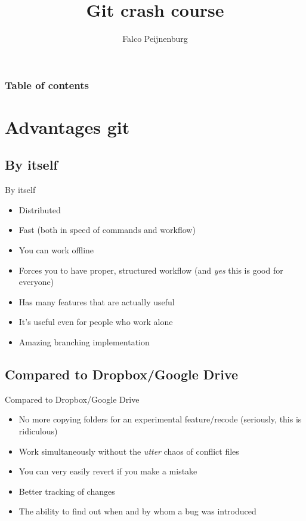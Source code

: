 \documentclass[10pt,a4paper]{beamer}
\author{Falco Peijnenburg}
\title[Git crash course\hspace{40mm} \insertframenumber/\inserttotalframenumber]{Git crash course}
\begin{document}
\frame{\titlepage}

\setcounter{tocdepth}{1}
\begin{frame}
\frametitle{Table of contents}
\tableofcontents[]
\end{frame}



\section{Advantages git}

\subsection{By itself}
\begin{frame}{By itself}
\begin{itemize}
\item Distributed
\item Fast (both in speed of commands and workflow)
\item You can work offline
\item Forces you to have proper, structured workflow (and \textit{yes} this is good for everyone)
\item Has many features that are actually useful
\item It's useful even for people who work alone
\item Amazing branching implementation

\end{itemize}
\end{frame}

\subsection{Compared to Dropbox/Google Drive}
\begin{frame}{Compared to Dropbox/Google Drive}
\begin{itemize}
\item No more copying folders for an experimental feature/recode (seriously, this is ridiculous)
\item Work simultaneously without the \textit{utter} chaos of conflict files
\item You can very easily revert if you make a mistake
\item Better tracking of changes
\item The ability to find out when and by whom a bug was introduced
\end{itemize}
\end{frame}
\end{document}
